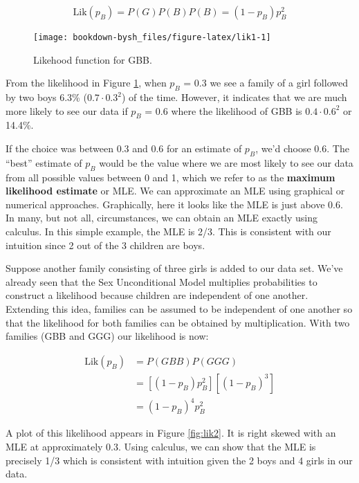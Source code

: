 \documentclass[
]{krantz}
\newcommand{\lik}{\mathrm{Lik}}
\begin{document}
\begin{equation*}
 \lik (p_B) = P(G)P(B)P(B) = (1-p_B)p_B^2
\end{equation*}

\begin{figure}

{\centering \texttt{[image: bookdown-bysh\_files/figure-latex/lik1-1]} 

}

\caption{Likehood function for GBB.}\label{fig:lik1}
\end{figure}

From the likelihood in Figure \ref{fig:lik1}, when \(p_B\) = 0.3 we see a family of a girl followed by two boys 6.3\% (\(0.7\cdot0.3^2\)) of the time. However, it indicates that we are much more likely to see our data if \(p_B\) = 0.6 where the likelihood of GBB is \(0.4\cdot0.6^2\) or 14.4\%.

If the choice was between 0.3 and 0.6 for an estimate of \(p_B\), we'd choose 0.6. The ``best'' estimate of \(p_B\) would be the value where we are most likely to see our data from all possible values between 0 and 1, which we refer to as the \textbf{maximum likelihood estimate} or MLE.  We can approximate an MLE using graphical or numerical approaches. Graphically, here it looks like the MLE is just above 0.6. In many, but not all, circumstances, we can obtain an MLE exactly using calculus. In this simple example, the MLE is 2/3. This is consistent with our intuition since 2 out of the 3 children are boys.

Suppose another family consisting of three girls is added to our data set. We've already seen that the Sex Unconditional Model multiplies probabilities to construct a likelihood because children are independent of one another. Extending this idea, families can be assumed to be independent of one another so that the likelihood for both families can be obtained by multiplication. With two families (GBB and GGG) our likelihood is now:

\begin{align*}
 \lik (p_B) &= P(GBB)P(GGG) \\
            &= [(1-p_B)p_B^2][(1-p_B)^3] \\
            &= (1-p_B)^4p_B^2
\end{align*}

A plot of this likelihood appears in Figure \ref{fig:lik2}. It is right skewed with an MLE at approximately 0.3. Using calculus, we can show that the MLE is precisely 1/3 which is consistent with intuition given the 2 boys and 4 girls in our data.
\end{document}
